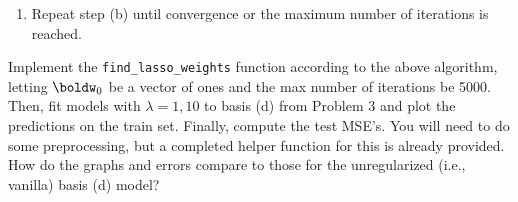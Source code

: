 \documentclass[submit]{harvardml}
\begin{document}
\begin{problem}
\begin{enumerate}
\begin{enumerate}
\begin{enumerate}
                \item If $d=1$, set $w_1 = \frac{\rho_1}{||\tilde{\boldx}_1||^2_2}$. Otherwise if $d\ne 1$, compute $w_d = \frac{\text{sign}(\rho_d)\max\left\{|\rho_d|-\frac{\lambda}{2}, 0\right\}}{||\tilde{\boldx}_d||^2_2}$.
            \end{enumerate}
            \item Repeat step (b) until convergence or the maximum number of iterations is reached.
        \end{enumerate} 
    
        Implement the \texttt{find\_lasso\_weights} function according to the above algorithm, letting $\boldw_0$ be a vector of ones and the max number of iterations be 5000. Then, fit models with $\lambda=1, 10$ to basis (d) from Problem 3 and plot the predictions on the train set. Finally, compute the test MSE's. You will need to do some preprocessing, but a completed helper function for this is already provided. How do the graphs and errors compare to those for the unregularized (i.e., vanilla) basis (d) model? 
    \end{enumerate}
\end{problem}

\newpage
\end{document}
